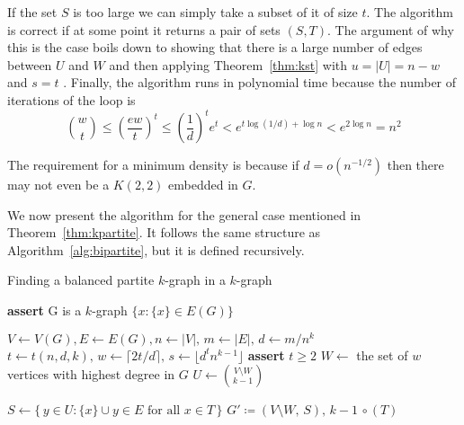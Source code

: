 If the set $S$ is too large we can simply take a subset of it of size $t$.
The algorithm is correct if at some point it returns a pair of sets $(S, T)$.
The argument of why this is the case boils down to showing that there is a
large number of edges between $U$ and $W$ and then applying Theorem~\ref{thm:kst}
with $u = |U| = n - w$ and $s = t$ .
Finally, the algorithm runs in polynomial time because 
the  number of iterations of the loop is
\[
    \binom{w}{t} \leq
    \left(\frac{ew}{t}\right)^t \leq
    \left(\frac{1}{d}\right)^t e^t < e^{t \log (1/d) + \log n} <
    e^{2\log n} = n^2
\]

\begin{remark}
    The requirement for a minimum density is because if $d = o\left(n^{-1/2}\right)$ then
    there may not even be a $K(2, 2)$ embedded in $G$. %
\end{remark}

We now present the algorithm for the general case mentioned in Theorem~\ref{thm:kpartite}.
It follows the same structure as Algorithm~\ref{alg:bipartite},
but it is defined recursively.

\begin{algorithm}
    \caption{Finding a balanced partite $k$-graph in a $k$-graph}
    \label{alg:kpartite}
    \begin{algorithmic}[1]
            \State \textbf{assert} G is a $k$-graph
                \State \Return $\{x : \{x\} \in E(G)\}$
            \EndIf

            \State $V \gets V(G), E \gets E(G), n \gets |V|,\, m \gets |E|,\, d \gets m/n^k$
            \State $t \gets t(n, d, k),\, w \gets \lceil 2t/d \rceil,\, s \gets \lfloor d^t n^{k-1} \rfloor$ \label{line:tws}
            \State \textbf{assert} $t \geq 2$ \label{line:min_t}
            \State $W \gets$ the set of $w$ vertices with highest degree in $G$ \label{line:W}
            \State $U \gets \binom{V\setminus W}{k-1}$

             \label{line:for}
                \State $S \gets \{\,y \in U : \{x\} \cup y \in E \text{ for all } x \in T\,\}$
                    \State \Return {}
                    {$G' \coloneqq (V \setminus W,\, S),\, k-1$} $\circ \, (T)$\label{line:return}
                \EndIf
            \EndFor
        \EndFunction
    \end{algorithmic}
\end{algorithm}

